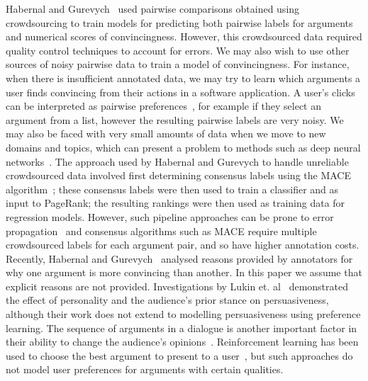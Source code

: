 Habernal and Gurevych~ used pairwise comparisons obtained using crowdsourcing 
to train models for predicting both 
pairwise labels for arguments and numerical scores of convincingness.
However, this crowdsourced data required quality control techniques to account for errors.
We may also wish to use other sources of noisy pairwise data to train a model of 
convincingness.
For instance, when there is insufficient annotated data, 
we may try to learn which arguments a user finds convincing from their actions in a software application.
A user's clicks can be interpreted as pairwise preferences~\cite{joachims2002optimizing},
for example if they select an argument from a list, however the resulting pairwise labels are very noisy.
We may also be faced with very small amounts of data when we move to new domains and topics,
which can present a problem to methods such as deep neural networks~\cite{srivastava2014dropout}.
The approach used by Habernal and Gurevych  to handle unreliable 
crowdsourced data involved first determining consensus labels using the MACE algorithm~\cite{hovy2013learning};
these consensus labels were then used to train a classifier and as input to 
PageRank; the resulting rankings were then used as training data for regression models.
However, such pipeline approaches can be prone to error propagation~\cite{chen2016joint} 
and consensus algorithms such as MACE require multiple crowdsourced labels for each argument pair, 
and so have higher annotation costs.
Recently, Habernal and Gurevych~ analysed reasons provided by annotators for why one argument is more convincing than another. In this paper we assume that explicit reasons are not provided. 
Investigations by Lukin et. al~ demonstrated the effect of personality and the audience's prior stance on persuasiveness,
although their work does not extend to modelling persuasiveness using preference learning.
The sequence of arguments in a dialogue is another important factor in their ability to change
the audience's opinions~\cite{tan2016winning}. Reinforcement learning has been used 
to choose the best argument to present to a user~\cite{rosenfeld2016providing,monteserin2013reinforcement},
but such approaches do not model user preferences for arguments with certain qualities.

